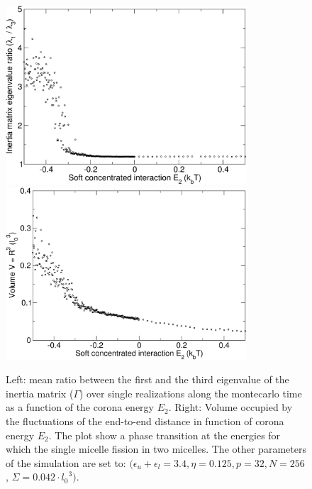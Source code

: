\documentclass[12pt,a4paper,notitlepage]{article}
\begin{document}
\begin{figure}[h!]
\centering
\includegraphics[width=9cm]{inert_loc_eq}\includegraphics[width=9cm]{r_loc_eq.pdf}\\
\caption{Left: mean ratio between the first and the third eigenvalue
  of the inertia matrix ($\Gamma$) over single realizations along the
  montecarlo time as a function of the corona energy $E_2$. Right:
  Volume occupied by the fluctuations of the end-to-end distance in
  function of corona energy $E_2$. The plot show a phase transition at
  the energies for which the single micelle fission in two
  micelles. The other parameters of the simulation are set to:
  $(\epsilon_u + \epsilon_l = 3.4, \eta = 0.125, p = 32, N = 256$,
  $\Sigma = 0.042 \cdot {l_0}^3)$.
}
\label{fig:inertion}
\end{figure}
\end{document}
